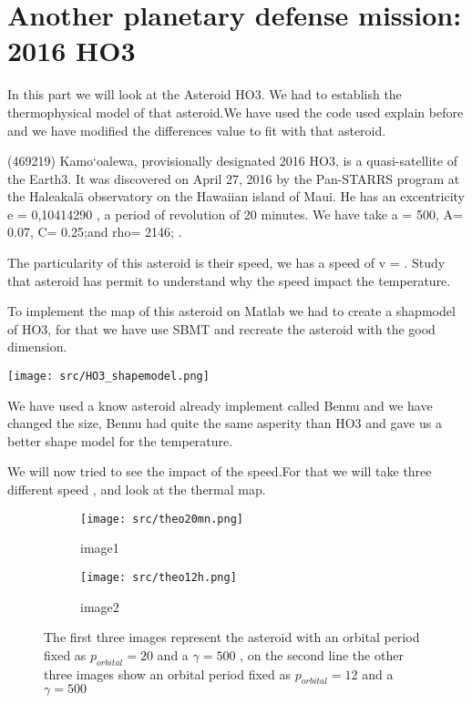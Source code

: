 \section{Another planetary defense mission: 2016 HO3}
\label{HO3}

In this part we will look at the Asteroid HO3. We had to establish the thermophysical model of that asteroid.We have used the code used explain before and we have modified the differences value to fit with that asteroid.\newline

(469219) Kamo‘oalewa, provisionally designated 2016 HO3, is a quasi-satellite of the Earth3. It was discovered on April 27, 2016 by the Pan-STARRS program at the Haleakalā observatory on the Hawaiian island of Maui.\newline
He has an excentricity e = 0,10414290 , a period of revolution of 20 minutes. We have take a \gamme = 500, A= 0.07, C= 0.25;and rho= 2146; .\newline

The particularity of this asteroid is their speed, we has a speed of v = . Study that asteroid has permit to understand why the speed impact the temperature.

To implement the map of this asteroid on Matlab we had to create a shapmodel of HO3, for that we have use SBMT and recreate the asteroid with the good dimension.\newline 
\begin{center}
    \captionsetup{type=figure}
    \texttt{[image: src/HO3\_shapemodel.png]}
\end{center}

We have used a know asteroid already implement called Bennu and we have changed the size, Bennu had quite the same asperity than HO3 and gave us a better shape model for the temperature.

We will now tried to see the impact of the speed.For that we will take three different speed , and look at the thermal map.\\[10pt]


\begin{figure}[htb]
    \centering %
\begin{subfigure}{0.25\textwidth}
  \texttt{[image: src/theo20mn.png]}
  \caption{image1}
  \label{fig:1}
\end{subfigure}\hfil %
\begin{subfigure}{0.25\textwidth}
  \texttt{[image: src/theo12h.png]}
  \caption{image2}
  \label{fig:2}
\end{subfigure}\hfil %
\caption{The first three images represent the asteroid with an orbital period fixed as $p_{orbital}=20 $ \minutes and a $\gamma = 500 $ , on the second line the other three images show an orbital period fixed as $p_{orbital}= 12 $ \hours and a $\gamma = 500 $}
\label{fig:images}
\end{figure}


